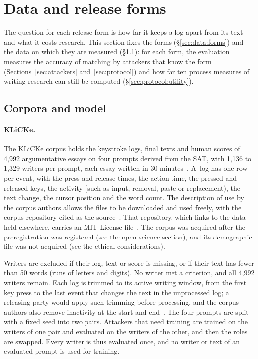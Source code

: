 \section{Data and release forms}
\label{sec:data}

The question for each release form is how far it keeps a log apart from its text and what it costs research. This
section fixes the forms (\S\ref{sec:data:forms}) and the data on which they are measured (\S\ref{sec:data:corpora}):
for each form, the evaluation measures the accuracy of matching by attackers that know the form
(Sections~\ref{sec:attackers} and~\ref{sec:protocol}) and how far ten process measures of writing research can still
be computed (\S\ref{sec:protocol:utility}).

\subsection{Corpora and model}
\label{sec:data:corpora}

\paragraph{KLiCKe.}
The KLiCKe corpus holds the keystroke logs, final texts and human scores of 4,992 argumentative essays on four prompts
derived from the SAT, with 1,136 to 1,329 writers per prompt, each essay written in 30 minutes~\cite{tian2025klicke}.
A~log has one row per event, with the press and release times, the action time, the pressed and released keys, the
activity (such as input, removal, paste or replacement), the text change, the cursor position and the word count. The
description of use by the corpus authors allows the files to be downloaded and used freely, with the corpus repository
cited as the source~\cite{inputlog2026community}. That repository, which links to the data held elsewhere, carries an
MIT License file~\cite{klicke2025repo}. The corpus was acquired after the preregistration was registered (see the open
science section), and its demographic file was not acquired (see the ethical considerations).

Writers are excluded if their log, text or score is missing, or if their text has fewer than 50 words (runs of letters
and digits). No writer met a criterion, and all 4,992 writers remain.
Each log is trimmed to its active writing window, from the first key press to the last event that changes the text in
the unprocessed log; a releasing party would apply such trimming before processing, and the corpus authors also remove
inactivity at the start and end~\cite{tian2025klicke}. The four prompts are split with a fixed seed into two pairs.
Attackers that need training are trained on the writers of one pair and evaluated on the writers of the other, and then
the roles are swapped. Every writer is thus evaluated once, and no writer or text of an evaluated prompt is used for
training.

